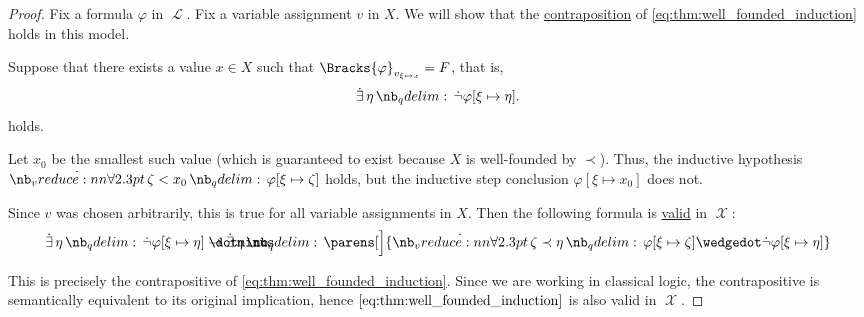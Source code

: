 \begin{proof}
  Fix a formula \( \varphi \) in \( \mscrL \). Fix a variable assignment \( v \) in \( X \). We will show that the \hyperref[def:conditional_formula/contrapositive]{contraposition} of \eqref{eq:thm:well_founded_induction} holds in this model.

  Suppose that there exists a value \( x \in X \) such that \( \Bracks{\varphi}_{v_{\xi \mapsto x}} = F \), that is,
  \begin{equation*}
    \qexists \eta \synneg \varphi[\xi \mapsto \eta].
  \end{equation*}
  holds.

  Let \( x_0 \) be the smallest such value (which is guaranteed to exist because \( X \) is well-founded by \( \prec \)). Thus, the inductive hypothesis \( \qforall {\zeta < x_0} \varphi[\xi \mapsto \zeta] \) holds, but the inductive step conclusion \( \varphi[\xi \mapsto x_0] \) does not.

  Since \( v \) was chosen arbitrarily, this is true for all variable assignments in \( X \). Then the following formula is \hyperref[def:first_order_model]{valid} in \( \mscrX \):
  \begin{equation}\label{eq:thm:well_founded_induction/contraposition}
    \qexists \eta \synneg \varphi[\xi \mapsto \eta]
    \synimplies
    \qexists \eta
    \parens[\Big]
      {
        \qforall {\zeta \prec \eta} \varphi[\xi \mapsto \zeta] \synwedge \synneg \varphi[\xi \mapsto \eta]
      }
  \end{equation}

  This is precisely the contrapositive of \eqref{eq:thm:well_founded_induction}. Since we are working in classical logic, the contrapositive is semantically equivalent to its original implication, hence \( \eqref{eq:thm:well_founded_induction} \) is also valid in \( \mscrX \).
\end{proof}

